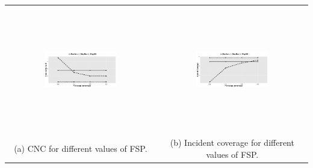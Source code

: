 \documentclass{acm_proc_article-sp}
\begin{document}
\begin{table}[!tb]
\centering
\begin{tabular}{cc}
   \includegraphics[width=0.5\textwidth, height=5.5cm]{figuresPng/Uni_ClosePeople_Count.png} &  \includegraphics[width=0.5\textwidth, height=5.5cm]{figuresPng/Uni-Inc_Coverage.png}\\
   (a) CNC for different values of FSP. & (b) Incident coverage for different values of FSP.\\
\end{tabular}
\label{fig:uniResults}
\end{table}


\end{document}
